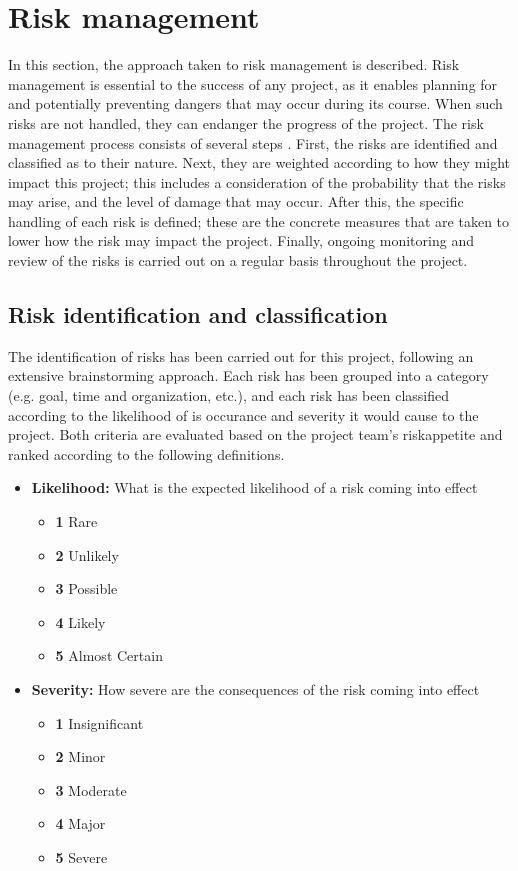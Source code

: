 \section{Risk management}
\label{ProjMgmtRisk}
In this section, the approach taken to risk management is described. Risk management is essential to the success of any project, as it enables planning for and potentially preventing dangers that may occur during its course. When such risks are not handled, they can endanger the progress of the project. The risk management process consists of several steps \cite{RiskmgmtWikipedia}. First, the risks are identified and classified as to their nature. Next, they are weighted according to how they might impact this project; this includes a consideration of the probability that the risks may arise, and the level of damage that may occur. After this, the specific handling of each risk is defined; these are the concrete measures that are taken to lower how the risk may impact the project. Finally, ongoing monitoring and review of the risks is carried out on a regular basis throughout the project.

\subsection*{Risk identification and classification}

The identification of risks has been carried out for this project, following an extensive brainstorming approach. Each risk has been grouped into a category (e.g. goal, time and organization, etc.), and each risk has been classified according to the likelihood of is occurance and severity it would cause to the project. Both criteria are evaluated based on the project team’s \gls{riskappetite} and ranked according to the following definitions.

\begin{itemize}
    \item \textbf{Likelihood:} What is the expected likelihood of a risk coming into effect
    \begin{itemize}
        \item \textbf{1} Rare
        \item \textbf{2} Unlikely
        \item \textbf{3} Possible
        \item \textbf{4} Likely
        \item \textbf{5} Almost Certain
    \end{itemize}

    \item \textbf{Severity:} How severe are the consequences of the risk coming into effect
    \begin{itemize}
        \item \textbf{1} Insignificant
        \item \textbf{2} Minor
        \item \textbf{3} Moderate
        \item \textbf{4} Major
        \item \textbf{5} Severe
    \end{itemize}
\end{itemize}

